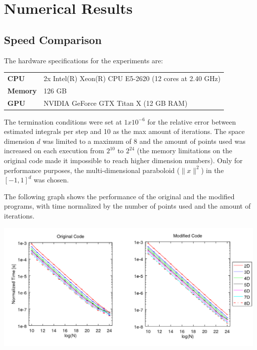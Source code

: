 \documentclass[english]{maciarticle}
\begin{document}
\section{Numerical Results}

\subsection*{Speed Comparison}
The hardware specifications for the experiments are:

\vspace{-1cm}

\begin{center}
	\begin{tabular}{ll}
		\hline
		\textbf{CPU} & 2x Intel(R) Xeon(R) CPU E5-2620 (12 cores at 2.40 GHz) \\
		\textbf{Memory} & 126 GB \\
		\textbf{GPU} & NVIDIA GeForce GTX Titan X (12 GB RAM)\\
		\hline
	\end{tabular}
\end{center}

\vspace{-1cm}

The termination conditions were set at $1x10^{-6}$ for the relative error between estimated integrals per step and 10 as the max amount of iterations. The space dimension $d$ was limited to a maximum of 8 and the amount of points used was increased on each execution from $2^{10}$ to $2^{24}$ (the memory limitations on the original code made it impossible to reach higher dimension numbers). Only for performance purposes, the multi-dimensional paraboloid ($\|x\|^2$) in the $[-1,1]^d$ was chosen.

The following graph shows the performance of the original and the modified programs, with time normalized by the number of points used and the amount of iterations.

\begin{center}
	\includegraphics[width = .9\textwidth]{comparison.png}
\end{center}
\end{document}
